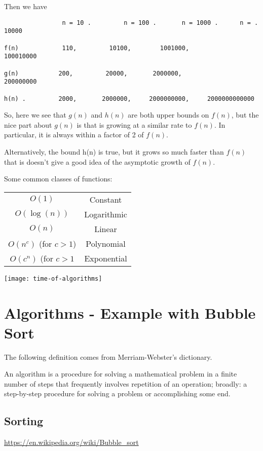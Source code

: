 \documentclass[../open-optimization/open-optimization.tex]{subfiles}
\begin{document}
Then we have
\begin{verbatim}
                n = 10 .         n = 100 .       n = 1000 .      n = .  10000

f(n)            110,         10100,        1001000,            100010000

g(n)           200,         20000,       2000000,              200000000

h(n) .         2000,       2000000,     2000000000,     2000000000000
\end{verbatim}


So, here we see that $g(n)$ and $h(n)$ are both upper bounds on $f(n)$, but the nice part about $g(n)$ is that is growing at a similar rate to $ f(n)$.  In particular, it is always within a factor of 2 of $f(n)$.  

Alternatively, the bound h(n) is true, but it grows so much faster than $f(n)$ that is doesn't give a good idea of the asymptotic growth of $f(n)$.




Some common classes of functions:
\begin{center}
\begin{tabular}{|c|c|}
\hline
$O(1)$ & Constant\\
$O(\log(n))$ & Logarithmic\\
$O(n)$ & Linear\\
$O(n^c)$ (for $c > 1$) & Polynomial\\
$O(c^n)$  (for $c > 1$ & Exponential\\
\hline
\end{tabular}
\end{center}
\texttt{[image: time-of-algorithms]}

\section{Algorithms - Example with Bubble Sort}
The following definition comes from Merriam-Webster's dictionary.
\begin{definition}
An algorithm is a procedure for solving a mathematical problem in a finite number of steps that frequently involves repetition of an operation; broadly: a step-by-step procedure for solving a problem or accomplishing some end.
\end{definition}
\subsection{Sorting }
\url{https://en.wikipedia.org/wiki/Bubble_sort}
\end{document}
